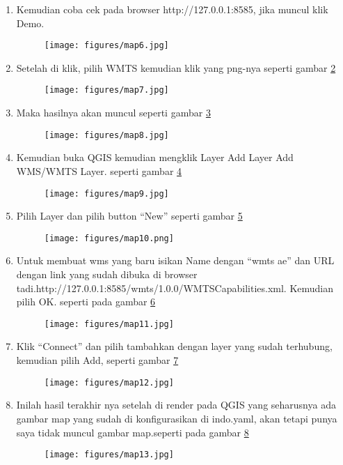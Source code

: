 \begin{enumerate}
    \item Kemudian coba cek pada browser http://127.0.0.1:8585, jika muncul klik Demo.
\begin{figure}[!htbp]
    \centering
    \texttt{[image: figures/map6.jpg]}
    \label{map6}
\end{figure}
    \item Setelah di klik, pilih WMTS kemudian klik yang png-nya seperti gambar \ref{map7}
\begin{figure}[!htbp]
    \centering
    \texttt{[image: figures/map7.jpg]}
    \label{map7}
\end{figure}
    \item Maka hasilnya akan muncul seperti gambar \ref{map8}
\begin{figure}[!htbp]
    \centering
    \texttt{[image: figures/map8.jpg]}
    \label{map8}
\end{figure}
    \item Kemudian buka QGIS kemudian mengklik Layer Add Layer Add WMS/WMTS Layer. seperti gambar \ref{map9}
\begin{figure}[!htbp]
    \centering
    \texttt{[image: figures/map9.jpg]}
    \label{map9}
\end{figure}
    \item Pilih Layer dan pilih button “New” seperti gambar \ref{map10}
\begin{figure}[!htbp]
    \centering
    \texttt{[image: figures/map10.png]}
    \label{map10}
\end{figure}
    \item Untuk membuat wms yang baru isikan Name dengan “wmts ae” dan URL dengan link yang sudah dibuka di browser tadi.http://127.0.0.1:8585/wmts/1.0.0/WMTSCapabilities.xml. Kemudian pilih OK. seperti pada gambar \ref{map11}
\begin{figure}[!htbp]
    \centering
    \texttt{[image: figures/map11.jpg]}
    \label{map11}
\end{figure}
    \item Klik “Connect” dan pilih tambahkan dengan layer yang sudah terhubung, kemudian pilih Add, seperti gambar \ref{map12}
\begin{figure}[!htbp]
    \centering
    \texttt{[image: figures/map12.jpg]}
    \label{map12}
\end{figure}
    \item Inilah hasil terakhir nya setelah di render pada QGIS yang seharusnya ada gambar map yang sudah di konfigurasikan di indo.yaml, akan tetapi punya saya tidak muncul gambar map.seperti pada gambar \ref{map13}
\begin{figure}[!htbp]
    \centering
    \texttt{[image: figures/map13.jpg]}
    \label{map13}
\end{figure}


\end{enumerate}

